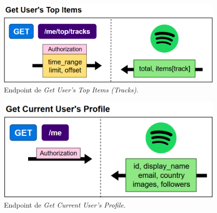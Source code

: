 \begin{figure}[H]
    \centering
    \includegraphics[width=\textwidth]{figures/endpoints/get_users_top_items.png}
    \caption{Endpoint de \textit{Get User's Top Items (Tracks)}.}
    \label{fig:get_usr_top_items_tracks}
\end{figure}

\begin{figure}[H]
    \centering
    \includegraphics[width=\textwidth]{figures/endpoints/get_current_users_profile.png}
    \caption{Endpoint de \textit{Get Current User's Profile}.}
    \label{fig:get_current_usr_profile}
\end{figure}




